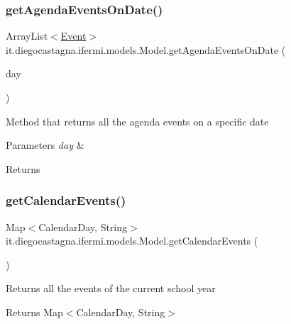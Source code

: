 \subsubsection{\texorpdfstring{getAgendaEventsOnDate()}{getAgendaEventsOnDate()}}
{\footnotesize\ttfamily Array\+List$<$\mbox{\hyperlink{classit_1_1diegocastagna_1_1ifermi_1_1utils_1_1_event}{Event}}$>$ it.\+diegocastagna.\+ifermi.\+models.\+Model.\+get\+Agenda\+Events\+On\+Date (\begin{DoxyParamCaption}\item[{Calendar\+Day}]{day }\end{DoxyParamCaption})\hspace{0.3cm}{\ttfamily [inline]}}

Method that returns all the agenda events on a specific date 
\begin{DoxyParams}{Parameters}
{\em day} & \\
\hline
\end{DoxyParams}
\begin{DoxyReturn}{Returns}

\end{DoxyReturn}
\mbox{\label{classit_1_1diegocastagna_1_1ifermi_1_1models_1_1_model_adff72f3afe2018d7814b2227083b93ad}} 
\subsubsection{\texorpdfstring{getCalendarEvents()}{getCalendarEvents()}}
{\footnotesize\ttfamily Map$<$Calendar\+Day, String$>$ it.\+diegocastagna.\+ifermi.\+models.\+Model.\+get\+Calendar\+Events (\begin{DoxyParamCaption}{ }\end{DoxyParamCaption})\hspace{0.3cm}{\ttfamily [inline]}}

Returns all the events of the current school year \begin{DoxyReturn}{Returns}
Map$<$\+Calendar\+Day, String$>$ 
\end{DoxyReturn}
\mbox{\label{classit_1_1diegocastagna_1_1ifermi_1_1models_1_1_model_a467c28bc69afc493d5bb97a39bea3cbf}} 
